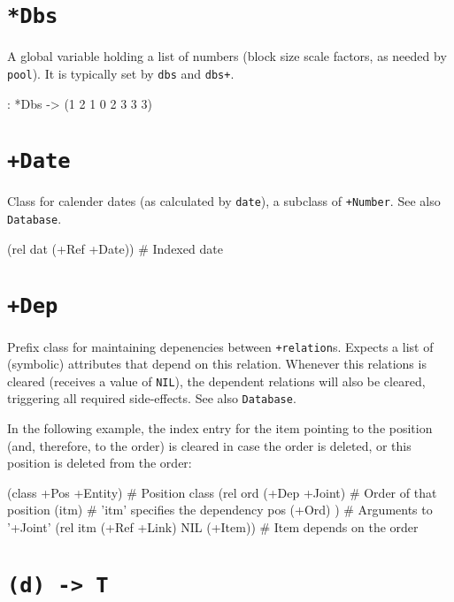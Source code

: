  
\section*{\texttt{*Dbs}}
\label{sec:func-ref-D-*Dbs}


A global variable holding a list of numbers (block size scale factors,
as needed by \texttt{pool}). It is typically set by \texttt{dbs} and \texttt{dbs+}.


\begin{wideverbatim}
: *Dbs
-> (1 2 1 0 2 3 3 3)
\end{wideverbatim}

 
\section*{\texttt{+Date}}
\label{sec:func-ref-D-+Date}


Class for calender dates (as calculated by \texttt{date}), a subclass of
\texttt{+Number}. See also \texttt{Database}.


\begin{wideverbatim}
(rel dat (+Ref +Date))  # Indexed date
\end{wideverbatim}

 
\section*{\texttt{+Dep}}
\label{sec:func-ref-D-+Dep}


Prefix class for maintaining depenencies between \texttt{+relation}s. Expects a
list of (symbolic) attributes that depend on this relation. Whenever
this relations is cleared (receives a value of \texttt{NIL}), the dependent
relations will also be cleared, triggering all required side-effects.
See also \texttt{Database}.

In the following example, the index entry for the item pointing to the
position (and, therefore, to the order) is cleared in case the order is
deleted, or this position is deleted from the order:


\begin{wideverbatim}
(class +Pos +Entity)                # Position class
(rel ord (+Dep +Joint)              # Order of that position
   (itm)                               # 'itm' specifies the dependency
   pos (+Ord) )                        # Arguments to '+Joint'
(rel itm (+Ref +Link) NIL (+Item))  # Item depends on the order
\end{wideverbatim}

 
\section*{\texttt{(d) -> T}}
\label{sec:func-ref-D-(d) -> T}


